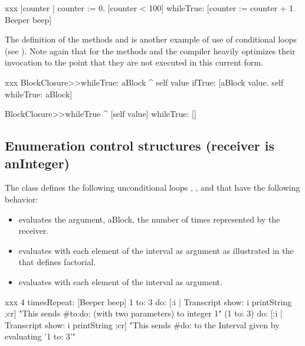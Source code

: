 \documentclass[a4paper,10pt,twoside]{book}
\begin{document}
\begin{script}[xxx]{xxx}\label{eg:whileloop}
|counter |
counter := 0.
[counter < 100] whileTrue: 
    [counter := counter + 1. 
    Beeper beep]
\end{script}

The definition of the methods  and  is another example of use of conditional loops (see ). Note again that for the methods  and  the compiler heavily optimizes their  invocation to the point that they are not executed in this current form. 

\begin{method}[xxx]{xxx}\label{mth:while}
BlockClosure>>whileTrue: aBlock
   ^ self value 
        ifTrue:	
           [aBlock value. 
         	  self whileTrue: aBlock]

BlockClosure>>whileTrue
   ^ [self value] whileTrue: [] 
\end{method}

\subsection{Enumeration control structures (receiver is anInteger)}
\label{sec:loopInteger}
The class  defines the following  unconditional loops , 
 , and   that have the following 
behavior: 

\begin{itemize}
\item {} evaluates the argument, aBlock, the number of times represented by the receiver.
\item {} evaluates  with each element of the interval  as argument as illustrated in the  that defines factorial.
\item {}	evaluates  with each element of the interval  as argument.
\end{itemize}

\begin{script}[xxx]{xxx}
4 timesRepeat: [Beeper beep]
1 to: 3 do: [:i | Transcript show: i printString ;cr] 
"This sends #to:do: (with two parameters) to integer 1"
(1 to: 3) do:  [:i | Transcript show: i printString ;cr] 
"This sends #do: to the Interval given by evaluating '1 to: 3'"
\end{script}
\end{document}
